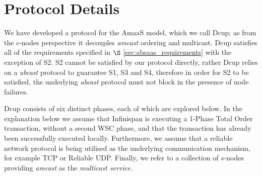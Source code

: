 \section{Protocol Details}\label{sec:decoupled_protocol}
We have developed a protocol for the \textsf{AmaaS} model, which we call \textsf{Dcup}; as from the $c$-nodes perspective it decouples \emph{amcast} ordering and multicast.  \textsf{Dcup} satisfies all of the requirements specified in $\S$ \ref{sec:absaas_requirements} with the exception of S2.  S2 cannot be satisfied by our protocol directly, rather \textsf{Dcup} relies on a \emph{abcast} protocol to guarantee S1, S3 and S4, therefore in order for S2 to be satisfied, the underlying \emph{abcast} protocol must not block in the presence of node failures.  

\textsf{Dcup} consists of six distinct phases, each of which are explored below.  In the explanation below we assume that Infinispan is executing a 1-Phase Total Order transaction, without a second WSC phase, and that the transaction has already been successfully executed locally.  Furthermore, we assume that a reliable network protocol is being utilised as the underlying communication mechanism, for example TCP\citep{Cerf:2005:PPN:1064413.1064423} or Reliable UDP\citep{ReliableUDP}.  Finally, we refer to a collection of $s$-nodes providing \emph{amcast} as the \emph{multicast service}.  

